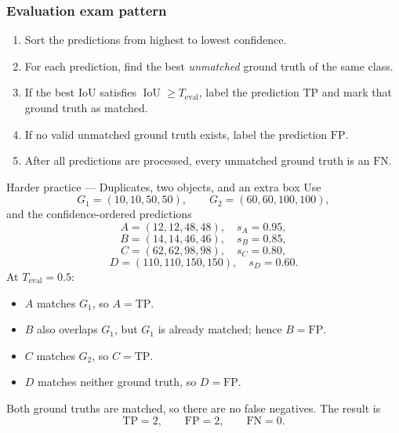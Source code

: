 \documentclass[11pt]{article}
\begin{document}
\subsubsection{Evaluation exam pattern}

\begin{focusbox}
\begin{enumerate}[label=\textbf{\arabic*.},leftmargin=*,align=left,nosep]
  \item Sort the predictions from highest to lowest confidence.
  \item For each prediction, find the best \emph{unmatched} ground truth of the same class.
  \item If the best IoU satisfies \(\operatorname{IoU}\geq T_{\mathrm{eval}}\), label the prediction \(\mathrm{TP}\) and mark that ground truth as matched.
  \item If no valid unmatched ground truth exists, label the prediction \(\mathrm{FP}\).
  \item After all predictions are processed, every unmatched ground truth is an \(\mathrm{FN}\).
\end{enumerate}
\end{focusbox}

\begin{practicebox}{Harder practice --- Duplicates, two objects, and an extra box}
Use
\[
G_1=(10,10,50,50),
\qquad
G_2=(60,60,100,100),
\]
and the confidence-ordered predictions
\[
A=(12,12,48,48),\quad s_A=0.95,
\]
\[
B=(14,14,46,46),\quad s_B=0.85,
\]
\[
C=(62,62,98,98),\quad s_C=0.80,
\]
\[
D=(110,110,150,150),\quad s_D=0.60.
\]
At \(T_{\mathrm{eval}}=0.5\):
\begin{itemize}[nosep]
  \item \(A\) matches \(G_1\), so \(A=\mathrm{TP}\).
  \item \(B\) also overlaps \(G_1\), but \(G_1\) is already matched; hence \(B=\mathrm{FP}\).
  \item \(C\) matches \(G_2\), so \(C=\mathrm{TP}\).
  \item \(D\) matches neither ground truth, so \(D=\mathrm{FP}\).
\end{itemize}
Both ground truths are matched, so there are no false negatives. The result is
\[
\boxed{\mathrm{TP}=2,\qquad \mathrm{FP}=2,\qquad \mathrm{FN}=0}.
\]
\end{practicebox}
\end{document}
